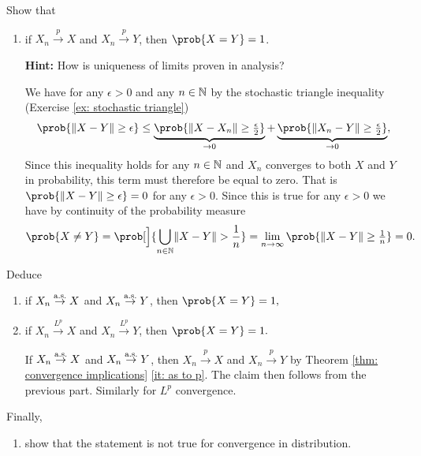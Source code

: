\begin{exercise}
    \label{ex: unique stochastic limits}
    Show that
    \begin{enumerate}[label=(\alph*),noitemsep]
        \item if \(X_n \overset{p}\to X\) and \(X_n \overset{p}\to Y\), then
        \(\prob{X = Y}=1\).

        \textbf{Hint:} How is uniqueness of limits proven in analysis?
        \begin{solution}
            We have for any \(\epsilon > 0\) and any \(n\in \mathbb{N}\) by the
            stochastic triangle inequality (Exercise \ref{ex: stochastic
            triangle})
            \[\begin{aligned}
                \prob{\norm{X - Y} \ge \epsilon}
                \le \underbrace{\prob{\norm{X - X_n} \ge \tfrac\epsilon2}}_{\to 0} + \underbrace{\prob{\norm{X_n - Y} \ge \tfrac\epsilon2}}_{\to 0},
            \end{aligned}
            \]
            Since this inequality holds for any \(n\in \mathbb{N}\) and \(X_n\)
            converges to both \(X\) and \(Y\) in probability, this term must
            therefore be equal to zero. That is \(\prob{\norm{X - Y} \ge
            \epsilon} = 0\) for any \(\epsilon > 0\). Since this is true for any
            \(\epsilon > 0\) we have by continuity of the probability measure
            \[
                \prob{X \neq Y} = \prob[\Big]{\bigcup_{n\in \nat}\norm{X - Y} > \frac1n} = \lim_{n\to\infty} \prob{\norm{X - Y} \ge \tfrac1n} = 0.
            \]
        \end{solution}
    \end{enumerate}
    Deduce
    \begin{enumerate}[label=(\alph*), resume,noitemsep]
        \item if \(X_n \overset{\operatorname{\text{a.s.}}}\to X\) and \(X_n \overset{\operatorname{\text{a.s.}}}\to Y\), then \(\prob{X = Y}=1,\)
        \item if \(X_n \overset{L^p}\to X\) and \(X_n \overset{L^p}\to Y\), then \(\prob{X = Y}=1.\)
        \begin{solution}
            If \(X_n \overset{\operatorname{\text{a.s.}}}\to X\) and \(X_n \overset{\operatorname{\text{a.s.}}}\to Y\), then
            \(X_n \overset{p}\to X\) and \(X_n \overset{p}\to Y\) by Theorem
            \ref{thm: convergence implications} \ref{it: as to p}. The claim
            then follows from the previous part. Similarly for \(L^p\) convergence.
        \end{solution}
    \end{enumerate}
    Finally, 
    \begin{enumerate}[label=(\alph*), resume, noitemsep]
        \item\label{it: non-unique limits convergence in dist} show that the statement is not true for convergence in
        distribution.


\end{enumerate}
\end{exercise}
